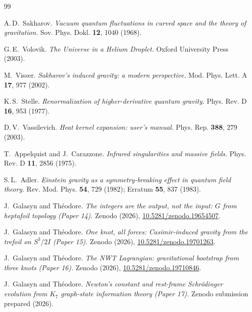 \documentclass[11pt]{article}
\begin{document}
\begin{thebibliography}{99}

  A.\,D.~Sakharov.
  \emph{Vacuum quantum fluctuations in curved space and the theory
  of gravitation.}
  Sov. Phys. Dokl. \textbf{12}, 1040 (1968).

  G.\,E.~Volovik.
  \emph{The Universe in a Helium Droplet.}
  Oxford University Press (2003).

  M.~Visser.
  \emph{Sakharov's induced gravity: a modern perspective.}
  Mod. Phys. Lett. A \textbf{17}, 977 (2002).

  K.\,S.~Stelle.
  \emph{Renormalization of higher-derivative quantum gravity.}
  Phys. Rev. D \textbf{16}, 953 (1977).

  D.\,V.~Vassilevich.
  \emph{Heat kernel expansion: user's manual.}
  Phys. Rep. \textbf{388}, 279 (2003).

  T.~Appelquist and J.~Carazzone.
  \emph{Infrared singularities and massive fields.}
  Phys. Rev. D \textbf{11}, 2856 (1975).

  S.\,L.~Adler.
  \emph{Einstein gravity as a symmetry-breaking effect in quantum
  field theory.}
  Rev. Mod. Phys. \textbf{54}, 729 (1982); Erratum
  \textbf{55}, 837 (1983).

  J.~Galasyn and Th\'eodore.
  \emph{The integers are the output, not the input: $G$ from
  heptafoil topology (Paper 14).}
  Zenodo (2026), \href{https://doi.org/10.5281/zenodo.19654507}
  {10.5281/zenodo.19654507}.

  J.~Galasyn and Th\'eodore.
  \emph{One knot, all forces: Casimir-induced gravity from the
  trefoil on $S^3/2I$ (Paper 15).}
  Zenodo (2026), \href{https://doi.org/10.5281/zenodo.19701263}
  {10.5281/zenodo.19701263}.

  J.~Galasyn and Th\'eodore.
  \emph{The NWT Lagrangian: gravitational bootstrap from three knots
  (Paper 16).}
  Zenodo (2026), \href{https://doi.org/10.5281/zenodo.19710846}
  {10.5281/zenodo.19710846}.

  J.~Galasyn and Th\'eodore.
  \emph{Newton's constant and rest-frame Schr\"odinger evolution
  from $K_7$ graph-state information theory (Paper 17).}
  Zenodo submission prepared (2026).


\end{thebibliography}
\end{document}
